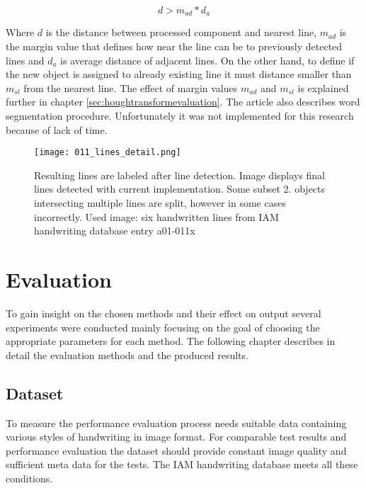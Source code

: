 \documentclass{article}
\begin{document}
            \begin{equation}
              d >  m_{ad}*d_a
            \end{equation}

            Where $d$ is the distance between processed component and nearest line, $m_{ad}$ is the margin value that defines how near the line can be to previously detected lines and $d_a$ is average distance of adjacent lines. On the other hand, to define if the new object is assigned to already existing line it must distance smaller than $m_{sl}$ from the nearest line. The effect of margin values $m_{ad}$ and $m_{sl}$ is explained further in chapter \ref{sec:houghtransformevaluation}. The article \cite{Louloudis2} also describes word segmentation procedure. Unfortunately it was not implemented for this research because of lack of time.

            \begin{figure}[!ht]
              \centering
              \texttt{[image: 011\_lines\_detail.png]}
              \caption{Resulting lines are labeled after line detection. Image displays final lines detected with current implementation. Some subset 2. objects intersecting multiple lines are split, however in some cases incorrectly. Used image: six handwritten lines from IAM handwriting database entry a01-011x \label{fig:finallines} }
            \end{figure}

  \newpage
  \section{Evaluation}
    To gain insight on the chosen methods and their effect on output several experiments were conducted mainly focusing on the goal of choosing the appropriate parameters for each method. The following chapter describes in detail the evaluation methods and the produced results.

  \subsection{Dataset}
    To measure the performance evaluation process needs suitable data containing various styles of handwriting in image format. For comparable test results and performance evaluation the dataset should provide constant image quality and sufficient meta data for the tests. The IAM handwriting database meets all these conditions.
\end{document}
